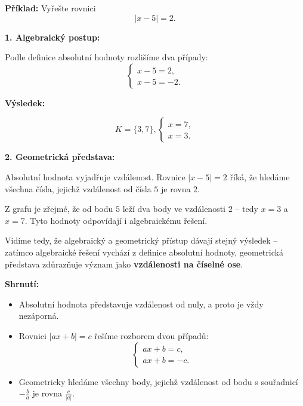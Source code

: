 \documentclass[12pt,a4paper]{article}
\begin{document}
\begin{examplebox}
\textbf{Příklad:}  
Vyřešte rovnici
\[
|x - 5| = 2.
\]

\textbf{1. Algebraický postup:}

Podle definice absolutní hodnoty rozlišíme dva případy:
\[
\begin{cases}
x - 5 = 2,\\[4pt]
x - 5 = -2.
\end{cases}
\]

\textbf{Výsledek:}

\[
K = \{3, 7\},
\begin{cases}
x = 7,\\[4pt]
x = 3.
\end{cases}
\]

\medskip
\textbf{2. Geometrická představa:}

Absolutní hodnota vyjadřuje vzdálenost.  
Rovnice \(|x - 5| = 2\) říká, že hledáme všechna čísla, jejichž vzdálenost od čísla \(5\) je rovna \(2\).

\begin{center}
\end{center}

Z grafu je zřejmé, že od bodu \(5\) leží dva body ve vzdálenosti \(2\) – tedy \(x = 3\) a \(x = 7\).  
Tyto hodnoty odpovídají i algebraickému řešení.

\end{examplebox}

\noindent
Vidíme tedy, že algebraický a geometrický přístup dávají stejný výsledek –  
zatímco algebraické řešení vychází z definice absolutní hodnoty,  
geometrická představa zdůrazňuje význam jako \textbf{vzdálenosti na číselné ose}.

\begin{notebox}
\textbf{Shrnutí:}
\begin{itemize}
  \item Absolutní hodnota představuje vzdálenost od nuly, a proto je vždy nezáporná.
  \item Rovnici \(|ax + b| = c\) řešíme rozborem dvou případů:
  \[
  \begin{cases}
  ax + b = c,\\[4pt]
  ax + b = -c.
  \end{cases}
  \]
  \item Geometricky hledáme všechny body, jejichž vzdálenost od bodu s souřadnicí \(-\tfrac{b}{a}\) je rovna \(\tfrac{c}{|a|}\).
\end{itemize}
\end{notebox}
\end{document}
